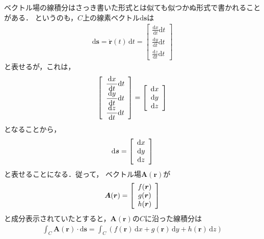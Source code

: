 ベクトル場の線積分はさっき書いた形式とは似ても似つかぬ形式で書かれることがある．
というのも，$C$上の線素ベクトル$\mathrm{d}\bm{s}$は
\begin{align*}
\mathrm{d} \bm{s} = \dot{ \bm{r} }(t) \, \mathrm{d} t = \left[
\begin{array}{c}
\displaystyle \frac{ \mathrm{d} x }{\mathrm{d} t } \mathrm{d} t \\
\displaystyle \frac{ \mathrm{d} y }{\mathrm{d} t } \mathrm{d} t \\
\displaystyle \frac{ \mathrm{d} z }{\mathrm{d} t } \mathrm{d} t 
\end{array}
\right]
\end{align*}
と表せるが，これは，
\begin{align*}
\left[
\begin{array}{c}
\displaystyle \frac{ \mathrm{d} x }{\mathrm{d} t } \mathrm{d} t \\
\displaystyle \frac{ \mathrm{d} y }{\mathrm{d} t } \mathrm{d} t \\
\displaystyle \frac{ \mathrm{d} z }{\mathrm{d} t } \mathrm{d} t 
\end{array}
\right] = \left[
\renewcommand{\arraystretch}{1}
\begin{array}{c}
\mathrm{d} x \\
\mathrm{d} y \\
\mathrm{d} z
\end{array}
\right]
\end{align*}
となることから，
\begin{align*}
\mathrm{d} \bm{s} = \left[
\renewcommand{\arraystretch}{1}
\begin{array}{c}
\mathrm{d} x \\
\mathrm{d} y \\
\mathrm{d} z 
\end{array}
\right]
\end{align*}
と表せることになる．従って，
ベクトル場$\bm{A}(\bm{r})$が
\begin{align*}
\bm{A} (\bm{r} ) = \left[
\renewcommand{\arraystretch}{1}
\begin{array}{c}
f( \bm{r} ) \\
g( \bm{r} ) \\
h ( \bm{r} ) \\
\end{array}
\right]
\end{align*}
と成分表示されていたとすると，$\bm{A}(\bm{r})$の$C$に沿った線積分は
\begin{align}
\int_C \bm{A} ( \bm{r} ) \cdot \mathrm{d} \bm{s} =
\int_C ( f( \bm{r} ) \, \mathrm{d} x + g( \bm{r} ) \, \mathrm{d} y + h(\bm{r}) \, \mathrm{d}z )
\label{eq:sensekibunvecseibun} 
\end{align}
